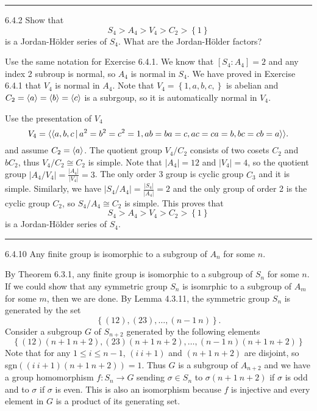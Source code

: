 \documentclass[a4paper, 12pt]{article}
\begin{document}
\noindent\rule{7in}{2.8pt}
\begin{problem}{6.4.2}
Show that 
\[S_4>A_4>V_4>C_2>\left\{ 1 \right\}\]
is a Jordan-H\"{o}lder series of \(S_4\). What are the Jordan-H\"{o}lder factors?
\end{problem}
\begin{solution}
Use the same notation for Exercise 6.4.1. We know that \([S_4:A_4]=2\) and any index 2 subroup is normal, so \(A_4\) is normal in \(S_4\). We have proved in Exercise 6.4.1 that \(V_4\) is normal in \(A_4\). Note that \(V_4=\left\{ 1,a,b,c, \right\}\) is abelian and 
\(C_2=\langle a\rangle=\langle b\rangle =\langle c\rangle\) is a subrgoup, so it is automatically normal in \(V_4\). 

Use the presentation of \(V_4\)
\[V_4=\langle\langle a,b,c\,|\, a^2=b^2=c^2=1, ab=ba=c,ac=ca=b,bc=cb=a\rangle\rangle.\]
and assume \(C_2=\langle a\rangle\). The quotient group \(V_4/C_2\) consists of two cosets \(C_2\) and \(bC_2\), thus \(V_4/C_2\cong C_2\) is simple.  
Note that \(|A_4|=12\) and \(|V_4|=4\), so the quotient group \(|A_4/V_4|=\frac{|A_4|}{|V_4|}=3\). The only order 3 group is cyclic group \(C_3\) and it is simple. 
Similarly, we have \(|S_4/A_4|=\frac{|S_4|}{|A_4|}=2\) and the only group of order 2 is the cyclic group \(C_2\), so \(S_4/A_4\cong C_2\) is simple. This proves that 
\[S_4>A_4>V_4>C_2>\left\{ 1 \right\}\]
is a Jordan-H\"{o}lder series of \(S_4\).
\end{solution}

\noindent\rule{7in}{2.8pt}
\begin{problem}{6.4.10}
Any finite group is isomorphic to a subgroup of \(A_n\) for some \(n\).
\end{problem}
\begin{solution}
By Theorem 6.3.1, any finite group is isomorphic to a subgroup of \(S_n\) for some \(n\). If we could show that any symmetric group \(S_n\) is isomrphic to a 
subgroup of \(A_m\) for some \(m\), then we are done. By Lemma 4.3.11, the symmetric group \(S_n\) is generated by the set 
\[\left\{ (12),(23),\ldots,(n-1\ n) \right\}.\]
Consider a subgroup \(G\) of \(S_{n+2}\) generated by the following elements 
\[\left\{ (12)(n+1\ n+2),(23)(n+1\ n+2),\ldots,(n-1\ n)(n+1\ n+2) \right\}\]
Note that for any \(1\leq i\leq n-1\), \((i\ i+1)\) and \((n+1\ n+2)\) are disjoint, so sgn\(((i\ i+1)(n+1\ n+2))=1\). Thus \(G\) is a subgroup of \(A_{n+2}\) and we have a 
group homomorphism \(f:S_n\rightarrow G\) sending \(\sigma\in S_n\) to \(\sigma (n+1\ n+2)\) if \(\sigma\) is odd and to \(\sigma\) if \(\sigma\) is even. This is also an isomorphism 
because \(f\) is injective and every element in \(G\) is a product of its generating set.
\end{solution}
\end{document}
